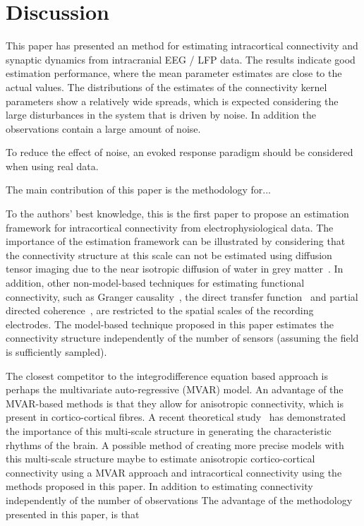 \documentclass[10pt,a4paper]{article}
\begin{document}
\section{Discussion}\label{DiscussionSection}
This paper has presented an method for estimating intracortical connectivity and synaptic dynamics from intracranial EEG / LFP data. The results indicate good estimation performance, where the mean parameter estimates are close to the actual values. The distributions of the estimates of the connectivity kernel parameters show a relatively wide spreads, which is expected considering the large disturbances in the system that is driven by noise. In addition the observations contain a large amount of noise. 

To reduce the effect of noise, an evoked response paradigm should be considered when using real data. 

The main contribution of this paper is the methodology for...

To the authors' best knowledge, this is the first paper to propose an estimation framework for intracortical connectivity from electrophysiological data. The importance of the estimation framework can be illustrated by considering that the connectivity structure at this scale can not be estimated using diffusion tensor imaging due to the near isotropic diffusion of water in grey matter~\cite{Assaf2008}. In addition, other non-model-based techniques for estimating functional connectivity, such as Granger causality~\cite{Hesse2003}, the direct transfer function~\cite{Kaminski1991} and partial directed coherence~\cite{Sameshima1999}, are restricted to the spatial scales of the recording electrodes. The model-based technique proposed in this paper estimates the connectivity structure independently of the number of sensors (assuming the field is sufficiently sampled). 

The closest competitor to the integrodifference equation based approach is perhaps the multivariate auto-regressive (MVAR) model. An advantage of the MVAR-based methods is that they allow for anisotropic connectivity, which is present in cortico-cortical fibres. A recent theoretical study~\cite{Jirsa2009} has demonstrated the importance of this multi-scale structure in generating the characteristic rhythms of the brain. A possible method of creating more precise models with this multi-scale structure maybe to estimate anisotropic cortico-cortical connectivity using a MVAR approach and intracortical connectivity using the methods proposed in this paper. In addition to estimating connectivity independently of the number of observations  The advantage of the methodology presented in this paper, is that 
\end{document}
